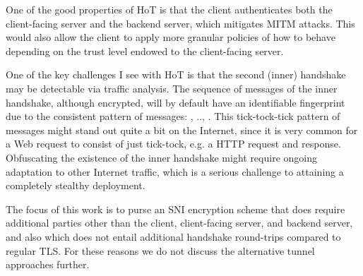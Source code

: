 One of the good properties of \ac{HoT} is that the client authenticates both the client-facing server and the backend server, which mitigates \ac{MITM} attacks. This would also allow the client to apply more granular policies of how to behave depending on the trust level endowed to the client-facing server.

One of the key challenges I see with \ac{HoT} is that the second (inner) handshake may be detectable via traffic analysis. The sequence of messages of the inner handshake, although encrypted, will by default have an identifiable fingerprint due to the consistent pattern of messages: , .., . This tick-tock-tick pattern of messages might stand out quite a bit on the Internet, since it is very common for a Web request to consist of just tick-tock, e.g. a \ac{HTTP} request and response.
Obfuscating the existence of the inner handshake might require ongoing adaptation to other Internet traffic, which is a serious challenge to attaining a completely stealthy deployment.

The focus of this work is to purse an \ac{SNI} encryption scheme that does
require additional parties other than the client, client-facing server, and backend server,
and also which does not entail additional handshake round-trips compared to regular \ac{TLS}.
For these reasons we do not discuss the alternative tunnel approaches further.
